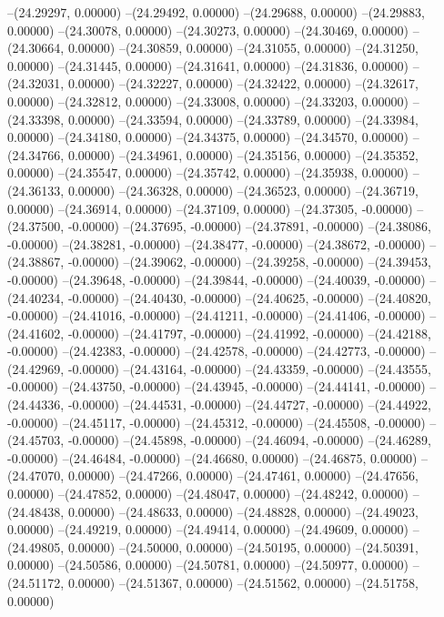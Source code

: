 --(24.29297, 0.00000)
--(24.29492, 0.00000)
--(24.29688, 0.00000)
--(24.29883, 0.00000)
--(24.30078, 0.00000)
--(24.30273, 0.00000)
--(24.30469, 0.00000)
--(24.30664, 0.00000)
--(24.30859, 0.00000)
--(24.31055, 0.00000)
--(24.31250, 0.00000)
--(24.31445, 0.00000)
--(24.31641, 0.00000)
--(24.31836, 0.00000)
--(24.32031, 0.00000)
--(24.32227, 0.00000)
--(24.32422, 0.00000)
--(24.32617, 0.00000)
--(24.32812, 0.00000)
--(24.33008, 0.00000)
--(24.33203, 0.00000)
--(24.33398, 0.00000)
--(24.33594, 0.00000)
--(24.33789, 0.00000)
--(24.33984, 0.00000)
--(24.34180, 0.00000)
--(24.34375, 0.00000)
--(24.34570, 0.00000)
--(24.34766, 0.00000)
--(24.34961, 0.00000)
--(24.35156, 0.00000)
--(24.35352, 0.00000)
--(24.35547, 0.00000)
--(24.35742, 0.00000)
--(24.35938, 0.00000)
--(24.36133, 0.00000)
--(24.36328, 0.00000)
--(24.36523, 0.00000)
--(24.36719, 0.00000)
--(24.36914, 0.00000)
--(24.37109, 0.00000)
--(24.37305, -0.00000)
--(24.37500, -0.00000)
--(24.37695, -0.00000)
--(24.37891, -0.00000)
--(24.38086, -0.00000)
--(24.38281, -0.00000)
--(24.38477, -0.00000)
--(24.38672, -0.00000)
--(24.38867, -0.00000)
--(24.39062, -0.00000)
--(24.39258, -0.00000)
--(24.39453, -0.00000)
--(24.39648, -0.00000)
--(24.39844, -0.00000)
--(24.40039, -0.00000)
--(24.40234, -0.00000)
--(24.40430, -0.00000)
--(24.40625, -0.00000)
--(24.40820, -0.00000)
--(24.41016, -0.00000)
--(24.41211, -0.00000)
--(24.41406, -0.00000)
--(24.41602, -0.00000)
--(24.41797, -0.00000)
--(24.41992, -0.00000)
--(24.42188, -0.00000)
--(24.42383, -0.00000)
--(24.42578, -0.00000)
--(24.42773, -0.00000)
--(24.42969, -0.00000)
--(24.43164, -0.00000)
--(24.43359, -0.00000)
--(24.43555, -0.00000)
--(24.43750, -0.00000)
--(24.43945, -0.00000)
--(24.44141, -0.00000)
--(24.44336, -0.00000)
--(24.44531, -0.00000)
--(24.44727, -0.00000)
--(24.44922, -0.00000)
--(24.45117, -0.00000)
--(24.45312, -0.00000)
--(24.45508, -0.00000)
--(24.45703, -0.00000)
--(24.45898, -0.00000)
--(24.46094, -0.00000)
--(24.46289, -0.00000)
--(24.46484, -0.00000)
--(24.46680, 0.00000)
--(24.46875, 0.00000)
--(24.47070, 0.00000)
--(24.47266, 0.00000)
--(24.47461, 0.00000)
--(24.47656, 0.00000)
--(24.47852, 0.00000)
--(24.48047, 0.00000)
--(24.48242, 0.00000)
--(24.48438, 0.00000)
--(24.48633, 0.00000)
--(24.48828, 0.00000)
--(24.49023, 0.00000)
--(24.49219, 0.00000)
--(24.49414, 0.00000)
--(24.49609, 0.00000)
--(24.49805, 0.00000)
--(24.50000, 0.00000)
--(24.50195, 0.00000)
--(24.50391, 0.00000)
--(24.50586, 0.00000)
--(24.50781, 0.00000)
--(24.50977, 0.00000)
--(24.51172, 0.00000)
--(24.51367, 0.00000)
--(24.51562, 0.00000)
--(24.51758, 0.00000)
